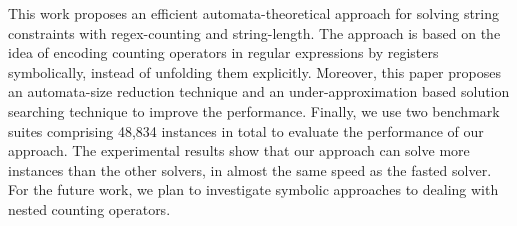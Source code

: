 %

This work proposes an efficient automata-theoretical approach for solving string constraints with regex-counting and string-length. The approach is based on the idea of encoding counting operators in regular expressions by registers symbolically, instead of unfolding them explicitly. Moreover, this paper proposes an automata-size reduction technique and an under-approximation based solution searching technique to improve the performance. Finally, we use two benchmark suites comprising 48,834 instances in total to evaluate the performance of our approach. The experimental results show that our approach can solve more instances than the other solvers, in almost the same speed as the fasted solver. 
For the future work, we plan to investigate symbolic approaches to dealing with nested counting operators. 




%